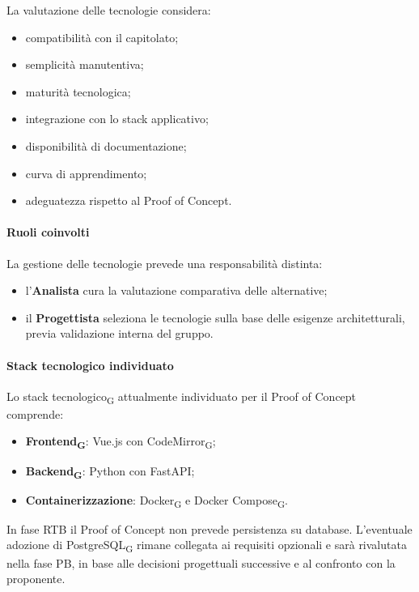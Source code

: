 La valutazione delle tecnologie considera:

\begin{itemize}
    \item compatibilità con il capitolato;
    \item semplicità manutentiva;
    \item maturità tecnologica;
    \item integrazione con lo stack applicativo;
    \item disponibilità di documentazione;
    \item curva di apprendimento;
    \item adeguatezza rispetto al Proof of Concept.
\end{itemize}

\paragraph{Ruoli coinvolti}

La gestione delle tecnologie prevede una responsabilità distinta:

\begin{itemize}
    \item l'\textbf{Analista} cura la valutazione comparativa delle alternative;
    \item il \textbf{Progettista} seleziona le tecnologie sulla base delle esigenze
    architetturali, previa validazione interna del gruppo.
\end{itemize}

\paragraph{Stack tecnologico individuato}

Lo stack tecnologico\textsubscript{G} attualmente individuato per il Proof of Concept comprende:

\begin{itemize}
    \item \textbf{Frontend\textsubscript{G}}: Vue.js con CodeMirror\textsubscript{G};
    \item \textbf{Backend\textsubscript{G}}: Python con FastAPI;
    \item \textbf{Containerizzazione}: Docker\textsubscript{G} e Docker Compose\textsubscript{G}.
\end{itemize}

In fase RTB il Proof of Concept non prevede persistenza su database. L'eventuale
adozione di PostgreSQL\textsubscript{G} rimane collegata ai requisiti opzionali e
sarà rivalutata nella fase PB, in base alle decisioni progettuali successive e
al confronto con la proponente.

